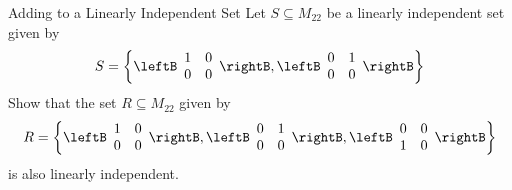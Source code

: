 \begin{example}{Adding to a Linearly Independent Set}\label{exa:addinglinind}
Let $S \subseteq M_{22}$ be a linearly independent set given by 
\[
S  = \left\{ \leftB \begin{array}{rr}
1 & 0 \\
0 & 0 
\end{array} \rightB, \leftB \begin{array}{rr}
0 & 1 \\
0 & 0 
\end{array} \rightB \right\}
\]
Show that the set $R \subseteq M_{22}$ given by 
\[
R = \left\{ \leftB \begin{array}{rr}
1 & 0 \\
0 & 0 
\end{array} \rightB, \leftB \begin{array}{rr}
0 & 1 \\
0 & 0 
\end{array} \rightB, \leftB \begin{array}{rr}
0 & 0 \\
1 & 0 
\end{array} \rightB \right\}
\]
is also linearly independent.
\end{example}

